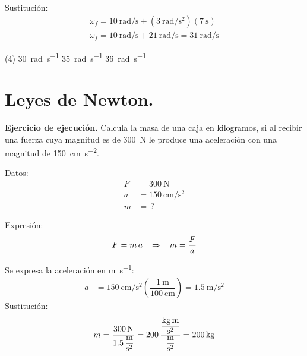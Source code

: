 \documentclass[12pt, letter]{exam}
\begin{document}
\begin{questions}
    Sustitución:
    \begin{align*}
    \omega_{f} = \SI[per-mode=fraction]{10}{\radian\per\second} + \left( \SI[per-mode=fraction]{3}{\radian\per\square\second} \right) \left( \SI{7}{\second} \right) \\[0.5em]
    \omega_{f} = \SI[per-mode=fraction]{10}{\radian\per\second} + \SI[per-mode=fraction]{21}{\radian\per\second} = \SI[per-mode=fraction]{31}{\radian\per\second}
    \end{align*}
    \begin{tasks}(4)
        \task \SI{30}{\radian\per\second}
        \task {}
        \task \SI{35}{\radian\per\second}
        \task \SI{36}{\radian\per\second}
    \end{tasks}

    \section{Leyes de Newton.}

    \setcounter{question}{19} \question \label{Ejercicio_10} \textbf{Ejercicio de ejecución. } Calcula la masa de una caja en kilogramos, si al recibir una fuerza cuya magnitud es de \SI{300}{\newton} le produce una aceleración con una magnitud de \SI{150}{\centi\meter\per\square\second}.
    
    \begin{minipage}[t]{0.35\linewidth}
    Datos: 
    \begin{align*}
    F &= \SI{300}{\newton} \\
    a &= \SI{150}{\centi\meter\per\square\second} \\
    m &= \, ?
    \end{align*}
    \end{minipage}
    \hspace{1cm}
    \begin{minipage}[t]{0.4\linewidth}
    Expresión:
    \begin{align*}
    F = m \, a \hspace{0.3cm} \Rightarrow \hspace{0.3cm} m = \dfrac{F}{a}
    \end{align*}
    \end{minipage}

    Se expresa la aceleración en \unit{\meter\per\second}:
    \begin{align*}
        a &= \SI[per-mode=fraction]{150}{\centi\meter\per\square\second} \left( \dfrac{\SI{1}{\meter}}{\SI{100}{\centi\meter}} \right) = \SI[per-mode=fraction]{1.5}{\meter\per\square\second}
    \end{align*}
    Sustitución:
    \begin{align*}
    m = \dfrac{\SI{300}{\newton}}{\displaystyle \SI[per-mode=fraction]{1.5}{\meter\per\square\second}} = \num{200} \, \dfrac{\displaystyle \unit[per-mode=fraction]{\kilo\gram\meter\per\square\second}}{\displaystyle \unit[per-mode=fraction]{\meter\per\square\second}} = \SI{200}{\kilo\gram}
    \end{align*}
        

\end{questions}
\end{document}
